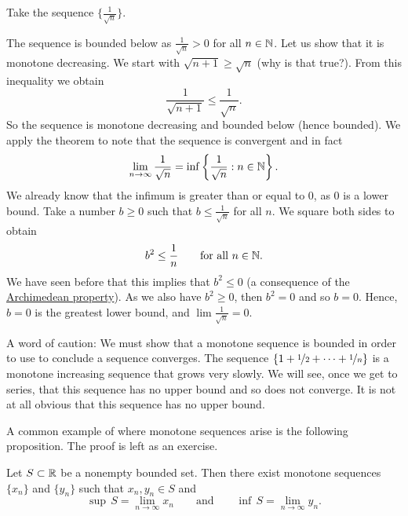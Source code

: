\begin{example}
Take the sequence $\bigl\{ \frac{1}{\sqrt{n}} \bigr\}$.

The sequence is
bounded below as
$\frac{1}{\sqrt{n}} > 0$ for all $n \in {\mathbb{N}}$.
Let us show that it is monotone decreasing.  We start with
$\sqrt{n+1} \geq \sqrt{n}$ (why is that true?).  From this inequality
we obtain
\begin{equation*}
\frac{1}{\sqrt{n+1}} \leq \frac{1}{\sqrt{n}} .
\end{equation*}
So the sequence is monotone decreasing and bounded below (hence
bounded).  We apply the theorem to note that the sequence is
convergent and in fact
\begin{equation*}
\lim_{n\to \infty} \frac{1}{\sqrt{n}}
=
\inf \left\{ \frac{1}{\sqrt{n}} : n \in {\mathbb{N}} \right\} .
\end{equation*}
We already know that the infimum is greater than or equal to 0, as
0 is a lower bound.  Take a number $b \geq 0$ such
that $b \leq \frac{1}{\sqrt{n}}$ for all $n$.  We square both sides to
obtain
\begin{equation*}
b^2 \leq \frac{1}{n} \qquad \text{for all } n \in {\mathbb{N}}.
\end{equation*}
We have seen before that this implies that $b^2 \leq 0$ (a consequence
of the \hyperref[thm:arch:i]{Archimedean property}).  As we also have $b^2 \geq 0$, then $b^2 = 0$
and so $b = 0$.
Hence, $b=0$ is the greatest lower bound, and $\lim \frac{1}{\sqrt{n}} = 0$.
\end{example}

\begin{example}
A word of caution:  We must show that a monotone sequence is bounded
in order to use  to conclude a sequence converges.
The sequence $\{ 1 + \nicefrac{1}{2} + \cdots + \nicefrac{1}{n} \}$
is a monotone increasing
sequence that grows very slowly.  We will see, once we get to series,
that this sequence has no upper bound and so does not converge.  It is not
at all obvious that this sequence has no upper bound.
\end{example}

A common example of where monotone sequences arise is the following
proposition.  The proof is left as an exercise.

\begin{prop} \label{prop:supinfseq}
Let $S \subset {\mathbb{R}}$ be a nonempty bounded set.
Then there exist monotone sequences
$\{ x_n \}$ and $\{ y_n \}$ such that $x_n, y_n \in S$ and
\begin{equation*}
\sup\,S = \lim_{n\to \infty} x_n \qquad \text{and} \qquad \inf\,S =
\lim_{n\to\infty} y_n .
\end{equation*}
\end{prop}


